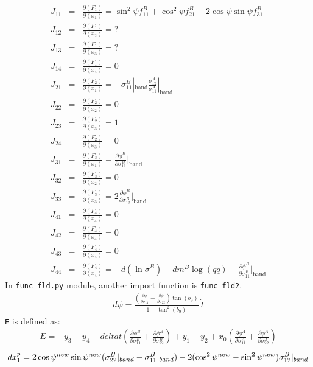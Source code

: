 \documentclass[12pt]{amsart}
\begin{document}
\begin{eqnarray}
  \label{eq:jacob_func_fld1}
  J_{11}&=&\frac{\partial(F_1)}{\partial(x_1)}= \sin^2\psi f^B_{11}+\cos^2\psi f^B_{21}-2\cos\psi\sin\psi f^B_{31}\\
  J_{12}&=&\frac{\partial(F_1)}{\partial(x_2)}= ?\nonumber \\
  J_{13}&=&\frac{\partial(F_1)}{\partial(x_3)}= ?\nonumber\\
  J_{14}&=&\frac{\partial(F_1)}{\partial(x_4)}=0  \nonumber\\
  J_{21}&=&\frac{\partial(F_2)}{\partial(x_1)}=-\sigma_{11}^B|_\text{band} \frac{\sigma_{12}^A}{\sigma_{11}^A}|_\text{band}  \nonumber\\
  J_{22}&=&\frac{\partial(F_2)}{\partial(x_2)}=0  \nonumber\\
  J_{23}&=&\frac{\partial(F_2)}{\partial(x_3)}=1  \nonumber\\
  J_{24}&=&\frac{\partial(F_2)}{\partial(x_3)}=0  \nonumber\\
  J_{31}&=&\frac{\partial(F_3)}{\partial(x_1)}=\frac{\partial \phi^B}{\partial \sigma^B_{11}}|_\text{band}    \nonumber\\
  J_{32}&=&\frac{\partial(F_3)}{\partial(x_2)}=0  \nonumber\\
  J_{33}&=&\frac{\partial(F_3)}{\partial(x_3)}=2 \frac{\partial \phi^B}{\partial \sigma^B_{12}}|_\text{band}  \nonumber\\
  J_{41}&=&\frac{\partial(F_4)}{\partial(x_4)}=0 \nonumber\\
  J_{42}&=&\frac{\partial(F_4)}{\partial(x_4)}=0\nonumber\\
  J_{43}&=&\frac{\partial(F_4)}{\partial(x_4)}=0\nonumber\\
  J_{44}&=&\frac{\partial(F_4)}{\partial(x_4)}=-d(\ln{\bar{\sigma}^B}) - dm^B \log(qq)-\frac{\partial \phi^B}{\partial \sigma^B_{11}}|_\text{band}\nonumber
\end{eqnarray}
In \verb|func_fld.py| module, another import function is \verb|func_fld2|.
\begin{eqnarray}
  \label{eq:dpsi}
  d\psi=\frac{ (\frac{\partial \phi}{\partial\sigma_{11}}-\frac{\partial \phi}{\partial\sigma_{22}}) \tan(b_9)}    {1+\tan^2(b_9)}\  \dot{t}
\end{eqnarray}
\verb|E| is defined as:
\begin{eqnarray}
  \label{eq:yancien}
  E = -y_3 - y_4 - deltat (\frac{\partial \phi^B}{\partial\sigma^B_{11}}+\frac{\partial \phi^B}{\partial\sigma^B_{22}})+y_1+y_2+x_0(\frac{\partial \phi^A}{\partial\sigma^A_{11}}+\frac{\partial \phi^A}{\partial\sigma^A_{22}})
\end{eqnarray}
\begin{equation}
  \label{eq:dxp}
  dx^p_1=2\cos\psi^{new}\sin\psi^{new}(\sigma_{22}^B|_{band}-\sigma_{11}^B|_{band}) \\
  - 2 (\cos^2\psi^{new}-\sin^2\psi^{new}) \sigma_{12}^B|_{band}
\end{equation}
\end{document}
